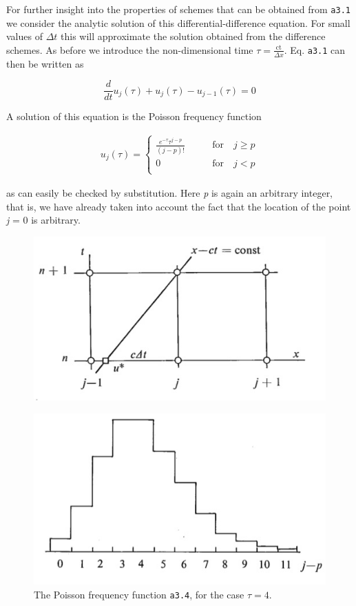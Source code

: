 For further insight into the properties of schemes that can be obtained
from \texttt{a3.1} we consider the analytic solution of this
differential-difference equation. For small values of \(\Delta t\) this
will approximate the solution obtained from the difference schemes. As
before we introduce the non-dimensional time
\(\tau = \frac{\text{ct}}{\Delta x}\). Eq. \texttt{a3.1} can then be
written as

 \[\frac{d}{d t}u_{j}\left( \tau \right) + u_{j}\left( \tau \right) - u_{j - 1}\left( \tau \right) = 0\]

A solution of this equation is the Poisson frequency function

 \[
  \begin{aligned}
     u_j(\tau) = \left\{ \begin{array}{cc}
                          \frac{e^{- \tau}\tau^{j - p}}{(j-p)!} \qquad &\textrm{for} \quad j \geq p \\
                           0  \qquad &\textrm{for} \quad j < p \\
     \end{array} \right.
\end{aligned}
 \]

as can easily be checked by substitution. Here \emph{p} is again an
arbitrary integer, that is, we have already taken into account the fact
that the location of the point \emph{j} = 0 is arbitrary.

\begin{figure}
 \centering
 \includegraphics[width = .7 \textwidth]{figs/NM/pic32.jpg}
 \caption{} \label{fig:}
\end{figure}

\begin{figure}
 \centering
 \includegraphics[width = .7 \textwidth]{figs/NM/pic33.jpg}
 \caption{The Poisson frequency function \texttt{a3.4}, for the case
  \(\tau = 4\).}
\end{figure}

